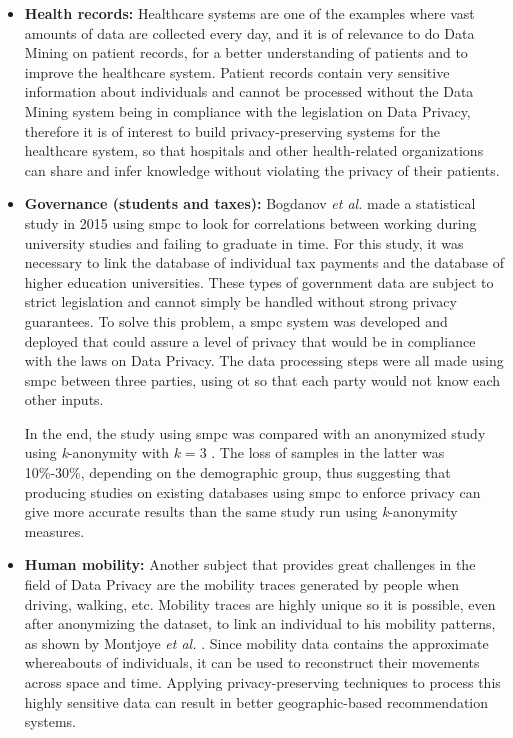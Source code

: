 \begin{itemize}
	
	\item \textbf{Health records:} Healthcare systems are one of the examples where vast amounts of data are collected every day, and it is of relevance to do Data Mining on patient records, for a better understanding of patients and to improve the healthcare system. Patient records contain very sensitive information about individuals and cannot be processed without the Data Mining system being in compliance with the legislation on Data Privacy, therefore it is of interest to build privacy-preserving systems for the healthcare system, so that hospitals and other health-related organizations can share and infer knowledge without violating the privacy of their patients.

	\item \textbf{Governance (students and taxes):} Bogdanov \textit{et al.} \cite{Bogdanov2015} made a statistical study in 2015 using \ac{smpc} to look for correlations between working during university studies and failing to graduate in time. For this study, it was necessary to link the database of individual tax payments and the database of higher education universities. These types of government data are subject to strict legislation and cannot simply be handled without strong privacy guarantees.
    To solve this problem, a \ac{smpc} system was developed and deployed that could assure a level of privacy that would be in compliance with the laws on Data Privacy. The data processing steps were all made using \ac{smpc} between three parties, using \ac{ot} so that each party would not know each other inputs.
    
    In the end, the study using \ac{smpc} was compared with an anonymized study using \textit{k}-anonymity with $\textit{k}=3$ . The loss of samples in the latter was 10\%-30\%, depending on the demographic group, thus suggesting that producing studies on existing databases using \ac{smpc} to enforce privacy can give more accurate results than the same study run using \textit{k}-anonymity measures.

	\item \textbf{Human mobility:} Another subject that provides great challenges in the field of Data Privacy are the mobility traces generated by people when driving, walking, etc. Mobility traces are highly unique so it is possible, even after anonymizing the dataset, to link an individual to his mobility patterns, as shown by Montjoye \textit{et al.} \cite{de2013unique}. Since mobility data contains the approximate whereabouts of individuals, it can be used to reconstruct their movements across space and time. Applying privacy-preserving techniques to process this highly sensitive data can result in better geographic-based recommendation systems.
\end{itemize}


